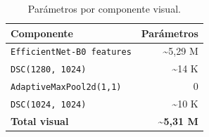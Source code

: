 \begin{table}[H]
\centering
\caption{Parámetros por componente visual.}
\label{tab:vis-params-linea}
\begin{tabular}{lr}
\toprule
\textbf{Componente} & \textbf{Parámetros} \\
\midrule
\texttt{EfficientNet-B0 features}   & \textasciitilde 5,29 M \\
\texttt{DSC(1280, 1024)}             & \textasciitilde 14 K \\
\texttt{AdaptiveMaxPool2d(1,1)}      & 0 \\
\texttt{DSC(1024, 1024)}             & \textasciitilde 10 K \\
\midrule
\textbf{Total visual}                & \textbf{\textasciitilde 5,31 M} \\
\bottomrule
\end{tabular}
\end{table}
